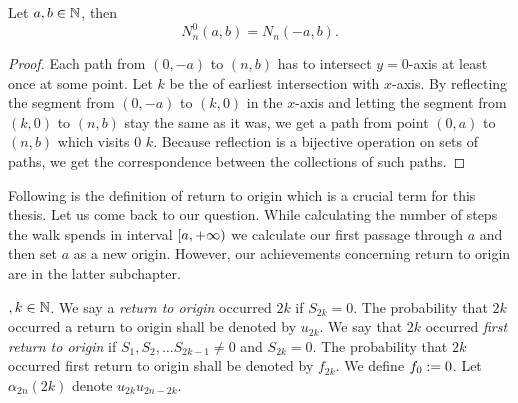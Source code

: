 \begin{thm}\label{thm-reflection_principle}
 Let $a,b \in \mathbb{N}$, then
 \[
    N_n^0 \left( a,b \right) =N_n \left( -a,b \right).
  \]
\end{thm}
\begin{proof}
 Each path from $ \left( 0,-a \right) $ to $ \left( n,b \right) $ has to intersect $y=0$-axis at least once at some point.
 Let $k$ be the \Time of earliest intersection with $x$-axis. By reflecting the segment from $\left( 0,-a \right)$ to $\left( k,0 \right)$ in the $x$-axis and letting the segment from $\left(k,0\right)$ to $\left(n,b\right)$ stay the same as it was,
 we get a path from point $\left( 0,a \right)$ to $ \left(n,b\right)$ which visits $0$ \intime $k$.
 Because reflection is a bijective operation on sets of paths, we get the correspondence between the collections of such paths.
\end{proof}

\begin{rem}
  Following is the definition of return to origin which is a crucial term for this thesis.
  Let us come back to our question.
  While calculating the number of steps the walk spends in interval $[a,{+\infty})$ we calculate our first passage through $a$ and then set $a$ as a new origin. However, our achievements concerning return to origin are in the latter subchapter.
\end{rem}

\begin{defn}\label{defn-return_origin}
 \Lrw$, k \in \mathbb{N}$. We say a \emph{return to origin} occurred \intime $2k$ if $S_{2k}=0$. The probability that \intime $2k$ occurred a return to origin shall be denoted by $u_{2k}$.
 We say that \intime $2k$ occurred \emph{first return to origin} if $S_1, S_2, \ldots S_{2k-1}\neq 0$ and $S_{2k}=0$.
 The probability that \intime $2k$ occurred first return to origin shall be denoted by $f_{2k}$. We define $f_0 := 0$.
 Let $\alpha_{2n} \left( 2k \right) $ denote $u_{2k}u_{2n-2k}.$
\end{defn}

